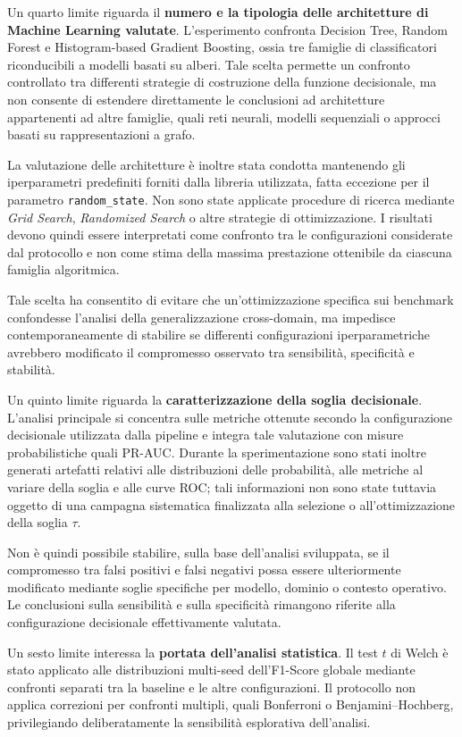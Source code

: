 Un quarto limite riguarda il \textbf{numero e la tipologia delle architetture di Machine Learning valutate}.
L'esperimento confronta Decision Tree, Random Forest e Histogram-based Gradient Boosting, ossia tre famiglie di classificatori riconducibili a modelli basati su alberi.
Tale scelta permette un confronto controllato tra differenti strategie di costruzione della funzione decisionale, ma non consente di estendere direttamente le conclusioni ad architetture appartenenti ad altre famiglie, quali reti neurali, modelli sequenziali o approcci basati su rappresentazioni a grafo.

La valutazione delle architetture è inoltre stata condotta mantenendo gli iperparametri predefiniti forniti dalla libreria utilizzata, fatta eccezione per il parametro \texttt{random\_state}.
Non sono state applicate procedure di ricerca mediante \textit{Grid Search}, \textit{Randomized Search} o altre strategie di ottimizzazione.
I risultati devono quindi essere interpretati come confronto tra le configurazioni considerate dal protocollo e non come stima della massima prestazione ottenibile da ciascuna famiglia algoritmica.

Tale scelta ha consentito di evitare che un'ottimizzazione specifica sui benchmark confondesse l'analisi della generalizzazione cross-domain, ma impedisce contemporaneamente di stabilire se differenti configurazioni iperparametriche avrebbero modificato il compromesso osservato tra sensibilità, specificità e stabilità.

Un quinto limite riguarda la \textbf{caratterizzazione della soglia decisionale}.
L'analisi principale si concentra sulle metriche ottenute secondo la configurazione decisionale utilizzata dalla pipeline e integra tale valutazione con misure probabilistiche quali PR-AUC.
Durante la sperimentazione sono stati inoltre generati artefatti relativi alle distribuzioni delle probabilità, alle metriche al variare della soglia e alle curve ROC; tali informazioni non sono state tuttavia oggetto di una campagna sistematica finalizzata alla selezione o all'ottimizzazione della soglia $\tau$.

Non è quindi possibile stabilire, sulla base dell'analisi sviluppata, se il compromesso tra falsi positivi e falsi negativi possa essere ulteriormente modificato mediante soglie specifiche per modello, dominio o contesto operativo.
Le conclusioni sulla sensibilità e sulla specificità rimangono riferite alla configurazione decisionale effettivamente valutata.

Un sesto limite interessa la \textbf{portata dell'analisi statistica}.
Il test $t$ di Welch è stato applicato alle distribuzioni multi-seed dell'F1-Score globale mediante confronti separati tra la baseline e le altre configurazioni.
Il protocollo non applica correzioni per confronti multipli, quali Bonferroni o Benjamini--Hochberg, privilegiando deliberatamente la sensibilità esplorativa dell'analisi.

